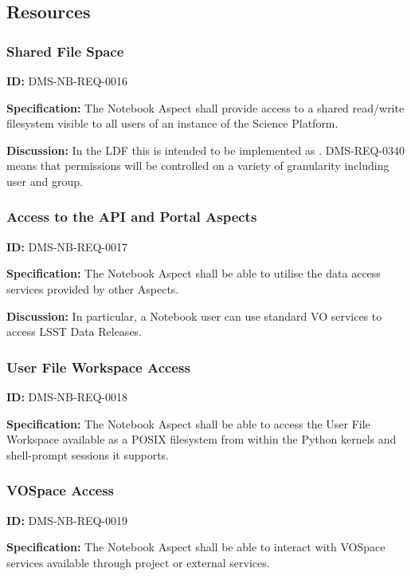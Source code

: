 \documentclass[SE,toc,lsstdraft]{lsstdoc}
\begin{document}
\subsection{Resources}

\subsubsection{Shared File Space}

\label{DMS-NB-REQ-0016}
\textbf{ID:} DMS-NB-REQ-0016

\textbf{Specification:}
The Notebook Aspect shall provide access to a shared read/write filesystem visible to all users of an instance of the Science Platform.

\textbf{Discussion:}
In the LDF this is intended to be implemented as .
DMS-REQ-0340 means that permissions will be controlled on a variety of granularity including user and group.

\subsubsection{Access to the API and Portal Aspects}

\label{DMS-NB-REQ-0017}
\textbf{ID:} DMS-NB-REQ-0017

\textbf{Specification:}
The Notebook Aspect shall be able to utilise the data access services provided by other Aspects.

\textbf{Discussion:}
In particular, a Notebook user can use standard VO services to access LSST Data Releases.

\subsubsection{User File Workspace Access}

\label{DMS-NB-REQ-0018}
\textbf{ID:} DMS-NB-REQ-0018

\textbf{Specification:}
The Notebook Aspect shall be able to access the User File Workspace available as a POSIX filesystem from within the Python kernels and shell-prompt sessions it supports.

\subsubsection{VOSpace Access}

\label{DMS-NB-REQ-0019}
\textbf{ID:} DMS-NB-REQ-0019

\textbf{Specification:}
The Notebook Aspect shall be able to interact with VOSpace services available through project or external services.
\end{document}
